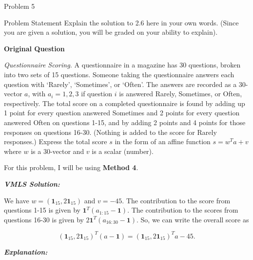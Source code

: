 \begin{problem}{Problem 5}
    \begin{statement}{Problem Statement}
        Explain the solution to 2.6 here in your own words. (Since you are given a solution, you will be graded on your ability to explain). \vspace*{1em}

        \textbf{Original Question} \vspace*{1em}

        \textit{Questionnaire Scoring.} A questionnaire in a magazine has 30 questions, broken into two sets of 15 questions. Someone taking the questionnaire answers each question with `Rarely',
        `Sometimes', or `Often'. The answers are recorded as a 30-vector $a$, with $a_{i} = 1,2,3$ if question $i$ is answered Rarely, Sometimes, or Often, respectively. The total score on a completed
        questionnaire is found by adding up 1 point for every question answered Sometimes and 2 points for every question answered Often on questions 1-15, and by adding 2 points and 4 points for those
        responses on questions 16-30. (Nothing is added to the score for Rarely responses.) Express the total score $s$ in the form of an affine function $s = w^{T}a + v$ where $w$ is a 30-vector and $v$
        is a scalar (number).
    \end{statement}

    \begin{highlight}[Solution]
        For this problem, I will be using \textbf{Method 4}. \vspace*{1em}

        \textbf{\textit{VMLS Solution:}} \vspace*{1em}

        We have $w = (\mathbf{1}_{15},2\mathbf{1}_{15})$ and $v = -45$. The contribution to the score from questions 1-15 is given by $\mathbf{1}^{T}(a_{1:15}-\mathbf{1})$. The contribution to the scores 
        from questions 16-30 is given by $2\mathbf{1}^{T}(a_{16:30}-\mathbf{1})$. So, we can write the overall score as

        \setcounter{equation}{0}
        \begin{equation}
            (\mathbf{1}_{15},2\mathbf{1}_{15})^{T}(a-\mathbf{1}) = (\mathbf{1}_{15},2\mathbf{1}_{15})^{T}a - 45.
        \end{equation}

        \textbf{\textit{Explanation:}} \vspace*{1em}


\end{highlight}
\end{problem}
